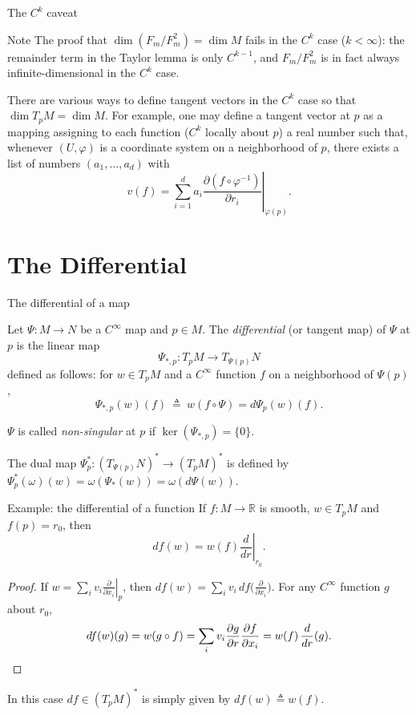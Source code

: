 \documentclass[10pt]{beamer}
\newcommand{\R}{\mathbb{R}}
\begin{document}
\begin{frame}{The $C^k$ caveat}
	\begin{block}{Note}
		The proof that $\dim (F_m / F_m^2) = \dim M$ fails in the $C^k$
		case ($k < \infty$): the remainder term in the Taylor lemma is only
		$C^{k-1}$, and $F_m / F_m^2$ is in fact always infinite-dimensional
		in the $C^k$ case.
	\end{block}
	There are various ways to define tangent vectors in the $C^k$ case so
	that $\dim T_p M = \dim M$. For example, one may define a tangent
	vector at $p$ as a mapping assigning to each function ($C^k$ locally
	about $p$) a real number such that, whenever $(U, \varphi)$ is a
	coordinate system on a neighborhood of $p$, there exists a list of
	numbers $(a_1, \dots, a_d)$ with
	\[
		v(f) = \sum_{i=1}^{d} a_i
		\left. \frac{\partial (f \circ \varphi^{-1})}{\partial r_i}
		\right|_{\varphi(p)} .
	\]
\end{frame}

\section{The Differential}

\begin{frame}{The differential of a map}
	\begin{definition}
		Let $\Psi : M \to N$ be a $C^\infty$ map and $p \in M$. The
		\emph{differential} (or tangent map) of $\Psi$ at $p$ is the linear
		map
		\[
			\Psi_{*, p} : T_p M \longrightarrow T_{\Psi(p)} N
		\]
		defined as follows: for $w \in T_p M$ and a $C^\infty$ function
		$f$ on a neighborhood of $\Psi(p)$,
		\[
			\Psi_{*, p}(w)(f) \ \triangleq\ w(f \circ \Psi)
			= d\Psi_p(w)(f).
		\]
	\end{definition}
	$\Psi$ is called \emph{non-singular} at $p$ if
	$\ker (\Psi_{*, p}) = \{0\}$.
	\medskip

	The dual map
	$\Psi_p^* : (T_{\Psi(p)} N)^* \longrightarrow (T_p M)^*$ is defined by
	$\Psi_p^*(\omega)(w) = \omega(\Psi_*(w)) = \omega(d\Psi(w))$.
\end{frame}

\begin{frame}{Example: the differential of a function}
	If $f : M \to \R$ is smooth, $w \in T_p M$ and $f(p) = r_0$, then
	\[
		df(w) = w(f) \left. \frac{d}{dr} \right|_{r_0}.
	\]
	\begin{proof}
		If $w = \sum_i v_i \left. \frac{\partial}{\partial x_i} \right|_p$,
		then $df(w) = \sum_i v_i\, df\bigl( \frac{\partial}{\partial x_i} \bigr)$.
		For any $C^\infty$ function $g$ about $r_0$,
		\[
			df(w)(g) = w(g \circ f)
			= \sum_i v_i \frac{\partial g}{\partial r}
			\frac{\partial f}{\partial x_i}
			= w(f)\, \frac{d}{dr}(g).
			\qedhere
		\]
	\end{proof}
	In this case $df \in (T_p M)^*$ is simply given by $df(w) \triangleq w(f)$.
\end{frame}
\end{document}

